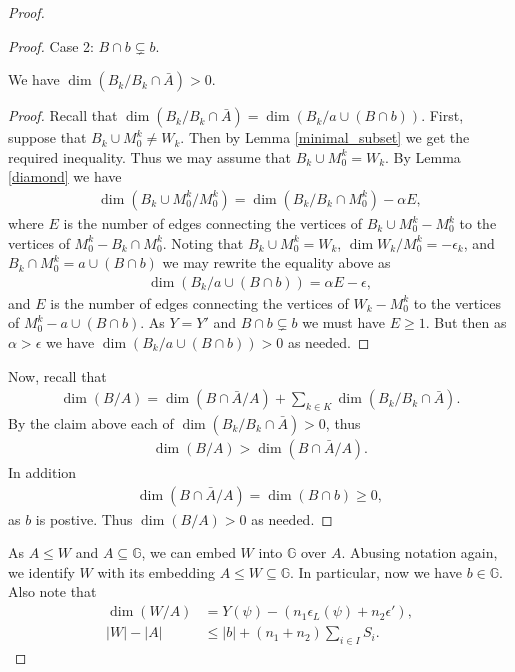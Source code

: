 \documentclass{amsart}
\newcommand{\GG}{\mathbb G}
\newcommand{\Y}{Y}
\newcommand{\paren}[1]{\left(#1\right)}
\begin{document}
\begin{proof}
\begin{proof}
    Case 2: $B \cap b \subsetneq b$.
    \begin{Claim} We have $\dim(B_k / B_k \cap \bar A) > 0$.
    \end{Claim}
    \begin{proof}
      Recall that $\dim(B_k / B_k \cap \bar A) = \dim(B_k / a \cup (B \cap b))$.
      First, suppose that $B_k \cup M_0^k \neq W_k$.
      Then by Lemma \ref{minimal_subset} we get the required inequality.
      Thus we may assume that $B_k \cup M_0^k = W_k$.
      By Lemma \ref{diamond} we have
      \begin{align*}
        \dim(B_k \cup M_0^k / M_0^k) = \dim(B_k / B_k \cap M_0^k) - \alpha E,
      \end{align*}
      where $E$ is the number of edges connecting the vertices of $B_k \cup M_0^k - M_0^k$ to the vertices of $M_0^k - B_k \cap M_0^k$.
      Noting that $B_k \cup M_0^k = W_k$, $\dim{W_k / M_0^k} = -\epsilon_k$, and $B_k \cap M_0^k = a \cup (B \cap b)$
      we may rewrite the equality above as
      \begin{align*}
        \dim(B_k / a \cup (B \cap b)) = \alpha E - \epsilon,
      \end{align*}
      and $E$ is the number of edges connecting the vertices of $W_k - M_0^k$ to the vertices of $M_0^k - a \cup (B \cap b)$.
      As $\Y = \Y'$ and $B \cap b \subsetneq b$ we must have $E \geq 1$.
      But then as $\alpha > \epsilon$ we have $\dim(B_k / a \cup (B \cap b)) > 0$ as needed.
    \end{proof}
    Now, recall that
    \begin{align*}
      \dim(B/A) = \dim(B \cap \bar A / A) + \sum_{k \in K} \dim(B_k/ B_k \cap \bar A).
    \end{align*}
    By the claim above each of $\dim(B_k/ B_k \cap \bar A) > 0$, thus
    \begin{align*}
      \dim(B/A) > \dim(B \cap \bar A / A).
    \end{align*}
    In addition
    \begin{align*}
      \dim(B \cap \bar A / A) = \dim (B \cap b) \geq 0,
    \end{align*}
    as $b$ is postive.
    Thus $\dim (B/A) > 0$ as needed.
  \end{proof}

  As $A \leq W$ and $A \subseteq \GG$, we can embed $W$ into $\GG$ over $A$.
  Abusing notation again, we identify $W$ with its embedding $A \leq W \subseteq \GG$.
  In particular, now we have $b \in \GG$.
  Also note that
  \begin{align*}
    \dim(W/A) &= Y(\psi) - \paren{n_1 \epsilon_L(\psi) + n_2 \epsilon'}, \\
    |W| - |A| &\leq |b| + (n_1 + n_2) \sum_{i \in I} S_i.
  \end{align*}


\end{proof}
\end{document}
